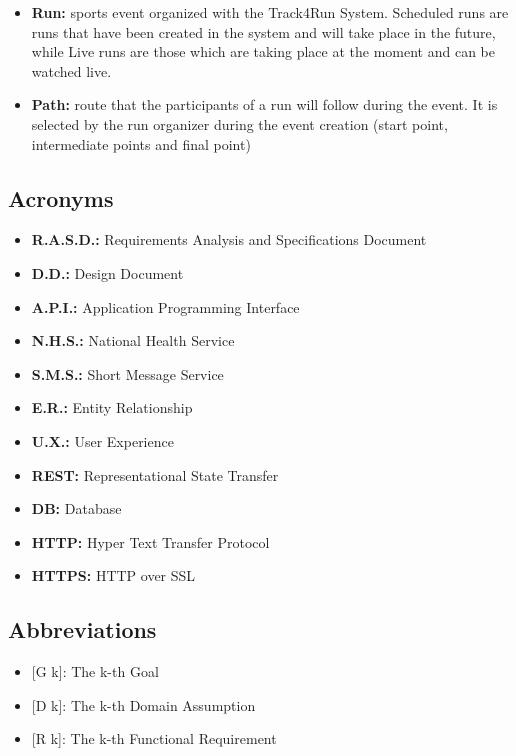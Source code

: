 \begin{itemize}
\item\textbf{Run:} sports event organized with the Track4Run System. Scheduled runs are runs that have been created in the system and will take place in the future, while Live runs are those which are taking place at the moment and can be watched live. 

\item\textbf{Path:} route that the participants of a run will follow during the event. It is selected by the run organizer during the event creation (start point, intermediate points and final point)

\end{itemize}

\subsection{Acronyms}

\begin{itemize}
  \item \textbf{R.A.S.D.:} Requirements Analysis and Specifications Document
  \item \textbf{D.D.:} Design Document
  \item \textbf{A.P.I.:} Application Programming Interface 
  \item \textbf{N.H.S.:} National Health Service
  \item \textbf{S.M.S.:} Short Message Service
  \item \textbf{E.R.:} Entity Relationship
  \item \textbf{U.X.:} User Experience 
  \item \textbf{REST:} Representational State Transfer
  \item \textbf{DB:} Database
  \item \textbf{HTTP:} Hyper Text Transfer Protocol
  \item \textbf{HTTPS:} HTTP over SSL
\end{itemize}

\subsection{Abbreviations}

\begin{itemize}
	\item {[}G k{]}: The k-th Goal
    \item {[}D k{]}: The k-th Domain Assumption
    \item {[}R k{]}: The k-th Functional Requirement
\end{itemize}